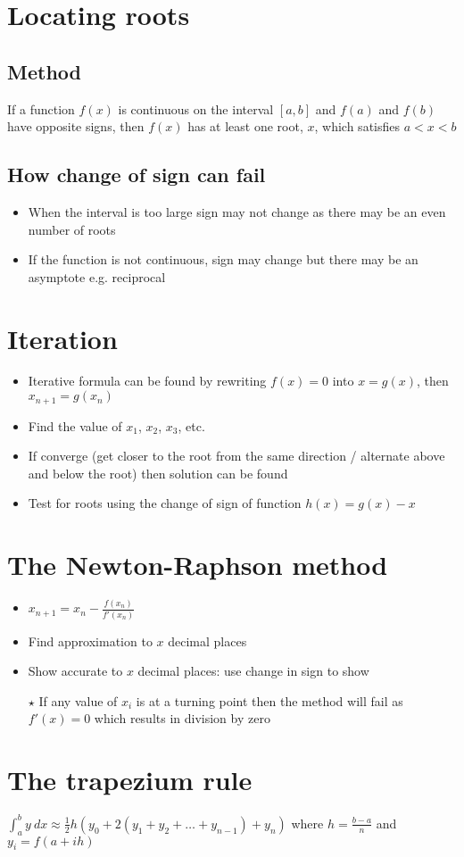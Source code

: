 \section{Locating roots}
\subsection{Method}
If a function $f(x)$ is continuous on the interval $[a,b]$ and $f(a)$ and $f(b)$ have opposite signs, then $f(x)$ has at least one root, $x$, which satisfies $a<x<b$
\subsection{How change of sign can fail}
\begin{itemize}
    \item When the interval is too large sign may not change as there may be an even number of roots
    \item If the function is not continuous, sign may change but there may be an asymptote e.g. reciprocal
\end{itemize}

\section{Iteration}
\begin{itemize}
    \item Iterative formula can be found by rewriting $f(x)=0$ into $x=g(x)$, then $x_{n+1}=g(x_n)$
    \item Find the value of $x_1$, $x_2$, $x_3$, etc.
    \item If converge (get closer to the root from the same direction / alternate above and below the root) then solution can be found
    \item Test for roots using the change of sign of function $h(x)=g(x)-x$
\end{itemize}

\section{The Newton-Raphson method}
\begin{itemize}
    \item $x_{n+1}=x_n-\frac{f(x_n)}{f'(x_n)}$
    \item Find approximation to $x$ decimal places
    \item Show accurate to $x$ decimal places: use change in sign to show
    \item[$\star$] If any value of $x_i$ is at a turning point then the method will fail as $f'(x)=0$ which results in division by zero
\end{itemize}

\section{The trapezium rule}
$\int_{a}^{b}y\:dx \approx \frac{1}{2} h (y_0+2(y_1+y_2+\dots+y_{n-1})+y_n)$ where $h=\frac{b-a}{n}$ and $y_i=f(a+ih)$
